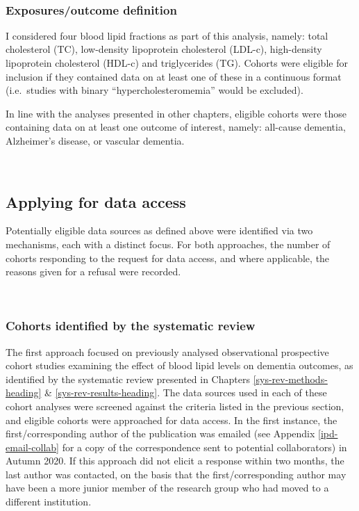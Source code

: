 \documentclass[a4paper, twoside]{templates/ociamthesis}
\begin{document}
~

\hypertarget{exposuresoutcome-definition}{%
\subsubsection{Exposures/outcome definition}\label{exposuresoutcome-definition}}

I considered four blood lipid fractions as part of this analysis, namely: total cholesterol (TC), low-density lipoprotein cholesterol (LDL-c), high-density lipoprotein cholesterol (HDL-c) and triglycerides (TG). Cohorts were eligible for inclusion if they contained data on at least one of these in a continuous format (i.e.~studies with binary ``hypercholesteromemia'' would be excluded).

In line with the analyses presented in other chapters, eligible cohorts were those containing data on at least one outcome of interest, namely: all-cause dementia, Alzheimer's disease, or vascular dementia.

~

\hypertarget{applying-for-data-access}{%
\subsection{Applying for data access}\label{applying-for-data-access}}

Potentially eligible data sources as defined above were identified via two mechanisms, each with a distinct focus. For both approaches, the number of cohorts responding to the request for data access, and where applicable, the reasons given for a refusal were recorded.

~

\hypertarget{cohorts-identified-by-the-systematic-review}{%
\subsubsection{Cohorts identified by the systematic review}\label{cohorts-identified-by-the-systematic-review}}

The first approach focused on previously analysed observational prospective cohort studies examining the effect of blood lipid levels on dementia outcomes, as identified by the systematic review presented in Chapters \ref{sys-rev-methods-heading} \& \ref{sys-rev-results-heading}. The data sources used in each of these cohort analyses were screened against the criteria listed in the previous section, and eligible cohorts were approached for data access. In the first instance, the first/corresponding author of the publication was emailed (see Appendix \ref{ipd-email-collab} for a copy of the correspondence sent to potential collaborators) in Autumn 2020. If this approach did not elicit a response within two months, the last author was contacted, on the basis that the first/corresponding author may have been a more junior member of the research group who had moved to a different institution.
\end{document}

